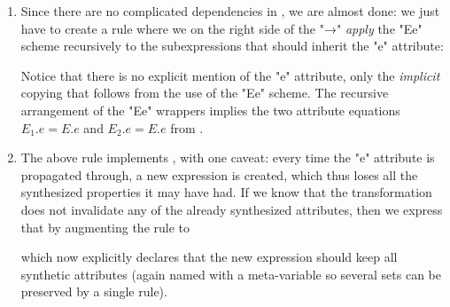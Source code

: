 \documentclass[11pt]{article} %
\begin{document}
\begin{enumerate}
\item Since there are no complicated dependencies in , we are almost done: we just have to
  create a rule where we on the right side of the "→" \emph{apply} the "Ee" scheme recursively to
  the subexpressions that should inherit the "e" attribute:
  Notice that there is no explicit mention of the "e" attribute, only the \emph{implicit} copying
  that follows from the use of the "Ee" scheme. The recursive  arrangement of the "Ee" wrappers
  implies the two attribute equations $E_1.e=E.e$ and $E_2.e=E.e$ from .

\item The above rule implements , with one caveat: every time the "e" attribute is
  propagated through, a new expression is created, which thus loses all the synthesized properties
  it may have had. If we know that the transformation does not invalidate any of the already
  synthesized attributes, then we express that by augmenting the rule to
  which now explicitly declares that the new expression should keep all synthetic attributes (again
  named with a meta-variable so several sets can be preserved by a single rule).


\end{enumerate}
\end{document}
